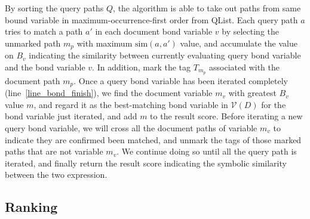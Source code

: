 \documentclass{acm_proc_article-sp}
\begin{document}
By sorting the query paths $Q$, the algorithm is able to take out paths from same bound variable in maximum-occurrence-first order from QList. 
Each query path $a$ tries to match a path $a'$ in each document bond variable $v$ by selecting the unmarked path $m_p$ with maximum $\mathrm{sim}(a,a')$ value, and accumulate the value on $B_v$ indicating the similarity between currently evaluating query bond variable and the bond variable $v$.
In addition, mark the tag $T_{m_p}$ associated with the document path $m_p$.
Once a query bond variable has been iterated completely (line~\ref{line_bond_finish}),
we find the document variable $m_v$ with greatest $B_v$ value $m$, and regard it as the best-matching bond variable in $\mathcal{V}(D)$ for the bond variable just iterated, and add $m$ to the result score.
Before iterating a new query bond variable, we will cross all the document paths of variable $m_v$ to indicate they are confirmed been matched, 
and unmark the tags of those marked paths that are not variable $m_v$.
We continue doing so until all the query path is iterated, and finally return the result score indicating the symbolic similarity between the two expression.

\subsection{Ranking}


\end{document}
